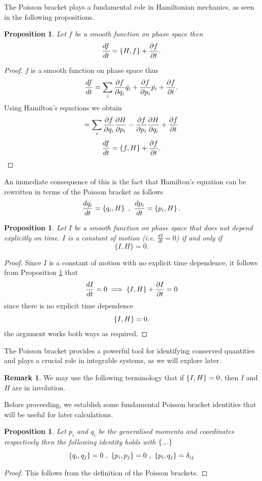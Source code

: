 \documentclass[12pt,oneside]{report}
\newtheorem{Proposition}[theorem]{Proposition}
\theoremstyle{definition}
\newtheorem{remark}{Remark}
\begin{document}
\noindent The Poisson bracket plays a fundamental role in Hamiltonian mechanics, as seen in the following propositions.


\begin{Proposition}\label{pbrel}
    Let $f$ be a smooth function on phase space then
   $$ \displaystyle\frac{d f}{d t}  = \displaystyle \left\{ H , f \right\} +\displaystyle\frac{\partial f}{\partial t} .$$
\end{Proposition}

\begin{proof}
$f$ is a smooth function on phase space thus
$$\displaystyle\frac{d f}{d t} = \sum_{i}\displaystyle\frac{\partial f}{\partial q_{i}}\dot{q_{i}}+ \displaystyle\frac{\partial f}{\partial p_{i}}\dot{p_{i}} + \displaystyle\frac{\partial f}{\partial t}.$$
Using Hamilton's equations we obtain
$$ =  \sum_{i}\displaystyle\frac{\partial f}{\partial q_{i}}\displaystyle\frac{\partial H}{\partial p_{i}} - \displaystyle\frac{\partial f}{\partial p_{i}}\displaystyle\frac{\partial H}{\partial q_{i}} +\displaystyle\frac{\partial f}{\partial t}$$
$$  \displaystyle\frac{d f}{d t}= \displaystyle \left\{ f , H \right\} + \displaystyle\frac{\partial f}{\partial t}.$$
    
\end{proof}
An immediate consequence of this is the fact that Hamilton's equation can be  rewritten in terms of the Poisson bracket as follows
$$ \td{q_{i}}{t}=\pb{q_{i}}{H} \ , \ \td{p_{i}}{t}=\pb{p_{i}}{H}.$$

\begin{Proposition}
    Let $I$ be a smooth function on phase space that does not depend explicitly on time. $I$ is a constant of motion (i.e. $\frac{dI}{dt}=0$) if and only if
    \[
    \{I,H\} = 0.
    \]
\end{Proposition}

 \begin{proof}
     Since $I$ is a constant of motion with no explicit time dependence, it follows from Proposition \ref{pbrel} that
     $$\displaystyle\frac{d I}{d t} = 0 \implies \displaystyle \left\{ I , H \right\} + \displaystyle\frac{\partial I}{\partial t} = 0$$
     since there is no explicit time dependence
     $$ \displaystyle \left\{ I , H \right\} = 0.$$
    the argument works both ways as required.
 \end{proof}

\noindent The Poisson bracket provides a powerful tool for identifying conserved quantities and plays a crucial role in integrable systems, as we will explore later.
\begin{remark}
 We may use the following terminology that if $\displaystyle \left\{ I , H \right\} = 0 $, then $I$ and $H$ are in involution.    
\end{remark}

Before proceeding, we establish some fundamental Poisson bracket identities that will be useful for later calculations.
\begin{Proposition}\label{useful id}
    Let $p_{i}$ and $q_{i}$ be the generalised momenta and coordinates respectively then the following identity holds with $\displaystyle \left\{ . , . \right\}$ 
    $$\displaystyle \left\{ q_{i} , q_{j} \right\} = 0 \ , \ \displaystyle \left\{ p_{i} , p_{j} \right\} = 0 \ , 
    \ \displaystyle \left\{ p_{i} , q_{j} \right\} = \delta_{ij}$$
\end{Proposition}
\begin{proof}
    This follows from the definition of the Poisson brackets.
\end{proof}
\end{document}
